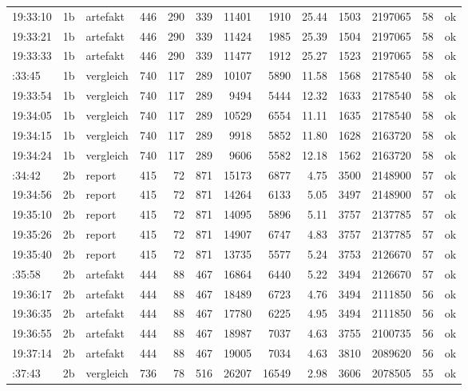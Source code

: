 {\begin{longtable}{lllrrrrrrrrrc}
19:33:10 & 1b   & artefakt  & 446 & 290 & 339 & 11401 & 1910  & 25.44 & 1503 & 2197065 & 58 & ok \\
19:33:21 & 1b   & artefakt  & 446 & 290 & 339 & 11424 & 1985  & 25.39 & 1504 & 2197065 & 58 & ok \\
19:33:33 & 1b   & artefakt  & 446 & 290 & 339 & 11477 & 1912  & 25.27 & 1523 & 2197065 & 58 & ok \\
\addlinespace
19:33:45 & 1b   & vergleich & 740 & 117 & 289 & 10107 & 5890  & 11.58 & 1568 & 2178540 & 58 & ok \\
19:33:54 & 1b   & vergleich & 740 & 117 & 289 &  9494 & 5444  & 12.32 & 1633 & 2178540 & 58 & ok \\
19:34:05 & 1b   & vergleich & 740 & 117 & 289 & 10529 & 6554  & 11.11 & 1635 & 2178540 & 58 & ok \\
19:34:15 & 1b   & vergleich & 740 & 117 & 289 &  9918 & 5852  & 11.80 & 1628 & 2163720 & 58 & ok \\
19:34:24 & 1b   & vergleich & 740 & 117 & 289 &  9606 & 5582  & 12.18 & 1562 & 2163720 & 58 & ok \\
\addlinespace
19:34:42 & 2b   & report    & 415 &  72 & 871 & 15173 & 6877  &  4.75 & 3500 & 2148900 & 57 & ok \\
19:34:56 & 2b   & report    & 415 &  72 & 871 & 14264 & 6133  &  5.05 & 3497 & 2148900 & 57 & ok \\
19:35:10 & 2b   & report    & 415 &  72 & 871 & 14095 & 5896  &  5.11 & 3757 & 2137785 & 57 & ok \\
19:35:26 & 2b   & report    & 415 &  72 & 871 & 14907 & 6747  &  4.83 & 3757 & 2137785 & 57 & ok \\
19:35:40 & 2b   & report    & 415 &  72 & 871 & 13735 & 5577  &  5.24 & 3753 & 2126670 & 57 & ok \\
\addlinespace
19:35:58 & 2b   & artefakt  & 444 &  88 & 467 & 16864 & 6440  &  5.22 & 3494 & 2126670 & 57 & ok \\
19:36:17 & 2b   & artefakt  & 444 &  88 & 467 & 18489 & 6723  &  4.76 & 3494 & 2111850 & 56 & ok \\
19:36:35 & 2b   & artefakt  & 444 &  88 & 467 & 17780 & 6225  &  4.95 & 3494 & 2111850 & 56 & ok \\
19:36:55 & 2b   & artefakt  & 444 &  88 & 467 & 18987 & 7037  &  4.63 & 3755 & 2100735 & 56 & ok \\
19:37:14 & 2b   & artefakt  & 444 &  88 & 467 & 19005 & 7034  &  4.63 & 3810 & 2089620 & 56 & ok \\
\addlinespace
19:37:43 & 2b   & vergleich & 736 &  78 & 516 & 26207 & 16549 &  2.98 & 3606 & 2078505 & 55 & ok \\

\end{longtable}}
